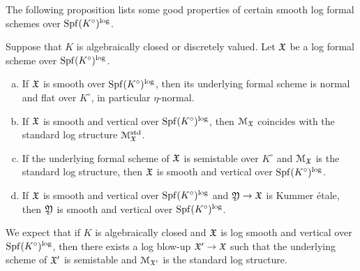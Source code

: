 The following proposition lists some good properties of certain smooth log formal schemes over $\operatorname{Spf}(K^\circ)^{\rm log}$.

\begin{prop} \label{prop:log-sm-vertical}
    Suppose that $K$ is algebraically closed or discretely valued. Let ${\mathfrak{X}}$ be a log formal scheme over $\operatorname{Spf}(K^\circ)^{\rm log}$.
    \begin{enumerate}[(a)]
        \item \label{propitem:log-sm-vertical-a}
        If ${\mathfrak{X}}$ is smooth over $\operatorname{Spf}(K^\circ)^{\rm log}$, then its underlying formal scheme is normal and flat over $K^\circ$, in particular $\eta$-normal.
        
        \item \label{propitem:log-sm-vertical-b}
        If ${\mathfrak{X}}$ is smooth and vertical over $\operatorname{Spf}(K^\circ)^{\rm log}$, then ${\mathcal M}_{\mathfrak{X}}$ coincides with the standard log structure ${\mathcal M}^{\rm std}_{\mathfrak{X}}$.
        
        \item \label{propitem:log-sm-vertical-c}
        If the underlying formal scheme of ${\mathfrak{X}}$ is semistable over $K^\circ$ and ${\mathcal M}_{\mathfrak{X}}$ is the standard log structure, then ${\mathfrak{X}}$ is smooth and vertical over $\operatorname{Spf}(K^\circ)^{\rm log}$. 
        
        \item \label{propitem:log-sm-vertical-d}
        If ${\mathfrak{X}}$ is smooth and vertical over $\operatorname{Spf}(K^\circ)^{\rm log}$ and ${\mathfrak{Y}}\to {\mathfrak{X}}$ is Kummer \'etale, then ${\mathfrak{Y}}$ is smooth and vertical over $\operatorname{Spf}(K^\circ)^{\rm log}$.
    \end{enumerate}
\end{prop}

\begin{rmk}
We expect that if $K$ is algebraically closed and ${\mathfrak{X}}$ is log smooth and vertical over $\operatorname{Spf}(K^\circ)^{\rm log}$, then there exists a log blow-up ${\mathfrak{X}}'\to{\mathfrak{X}}$ such that the underlying scheme of ${\mathfrak{X}}'$ is semistable and ${\mathcal M}_{{\mathfrak{X}}'}$ is the standard log structure.
\end{rmk}

